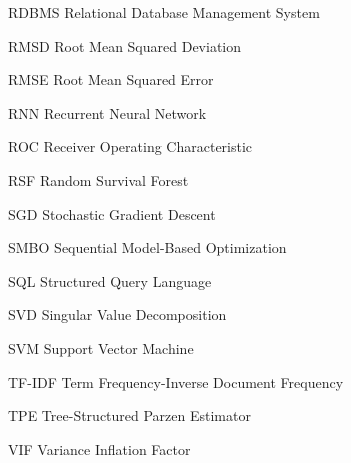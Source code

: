 \begin{symbollist}
  \item[RDBMS] Relational Database Management System
  \item[RMSD] Root Mean Squared Deviation
  \item[RMSE] Root Mean Squared Error
  \item[RNN] Recurrent Neural Network
  \item[ROC] Receiver Operating Characteristic
  \item[RSF] Random Survival Forest
  \item[SGD] Stochastic Gradient Descent
  \item[SMBO] Sequential Model-Based Optimization
  \item[SQL] Structured Query Language
  \item[SVD] Singular Value Decomposition
  \item[SVM] Support Vector Machine
  \item[TF-IDF] Term Frequency-Inverse Document Frequency
  \item[TPE] Tree-Structured Parzen Estimator
  \item[VIF] Variance Inflation Factor
\end{symbollist}
